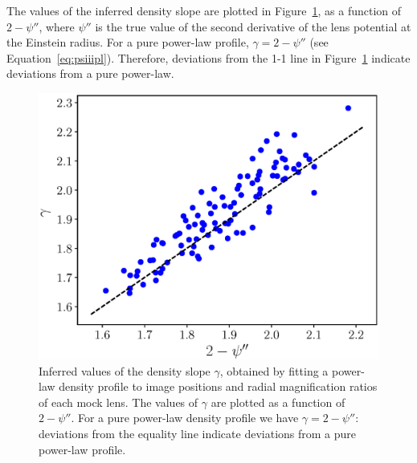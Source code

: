 \documentclass[usenatbib]{mnras}
\def\psiii{\psi''}
\def\Fref#1{Figure~\ref{#1}\xspace}
\def\Eref#1{Equation~\ref{#1}\xspace}
\begin{document}
The values of the inferred density slope are plotted in \Fref{fig:slope}, as a function of $2-\psiii$, where $\psiii$ is the true value of the second derivative of the lens potential at the Einstein radius. For a pure power-law profile, $\gamma = 2-\psiii$ (see \Eref{eq:psiiipl}). Therefore, deviations from the 1-1 line in \Fref{fig:slope} indicate deviations from a pure power-law.
%
\begin{figure}
 \includegraphics[width=\columnwidth]{gamma_fit.eps}
 \caption{
Inferred values of the density slope $\gamma$, obtained by fitting a power-law density profile to image positions and radial magnification ratios of each mock lens. The values of $\gamma$ are plotted as a function of $2-\psiii$. For a pure power-law density profile we have $\gamma = 2-\psiii$: deviations from the equality line indicate deviations from a pure power-law profile.
}
 \label{fig:slope}
\end{figure}
%
\end{document}
